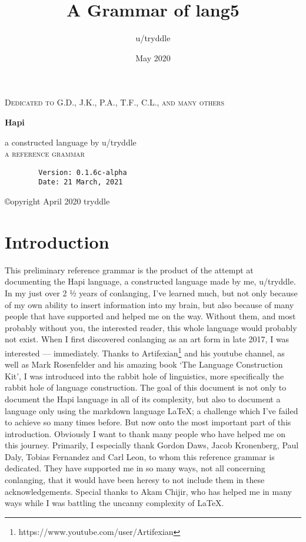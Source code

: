 \documentclass[a4paper, 12pt, oneside]{memoir}
\title{A Grammar of lang5}
\author{u/tryddle}
\date{May 2020}
\makeatletter
\newlength\drop
\newcommand*\titleM{\begingroup%
\setlength\drop{0.08\textheight}
\centering
{\scshape Dedicated to G.D., J.K., P.A., T.F., C.L., and many others\par}
\vspace*{\drop}
   
\vspace*{\drop}
\begin{flushleft}
{\HUGE\bfseries Hapi}\\
\end{flushleft}
\vspace*{\drop}
\vspace*{\drop}
\begin{flushright}
{\LARGE a constructed language by u/tryddle}\\[\baselineskip]
{\scshape a reference grammar}\\[\baselineskip]
{\scshape \@date}\par
\end{flushright}


\endgroup}
\makeatother
\begin{document}
\begin{titlingpage}
\titleM{}
\end{titlingpage}
\pagebreak
{}

\vspace*{\fill}

\begin{center}
    \begin{verbatim}
        Version: 0.1.6c-alpha
        Date: 21 March, 2021
    \end{verbatim}
    ©opyright April 2020 tryddle
\end{center}

\vspace*{\fill}

\restoregeometry

\pagebreak
\setcounter{tocdepth}{4}
\tableofcontents
\newpage 
\listoffigures
\listoftables
\newpage
\printglossaries
\newpage

\chapter{Introduction}
This preliminary reference grammar is the product of the attempt at documenting the Hapi language, a constructed language made by me, u/tryddle. In my just over 2 ½ years of conlanging, I've learned much, but not only because of my own ability to insert information into my brain, but also because of many people that have supported and helped me on the way. Without them, and most probably without you, the interested reader, this whole language would probably not exist. When I first discovered conlanging as an art form in late 2017, I was interested — immediately. Thanks to Artifexian\footnote{https://www.youtube.com/user/Artifexian} and his youtube channel, as well as Mark Rosenfelder and his amazing book `The Language Construction Kit', I was introduced into the rabbit hole of linguistics, more specifically the rabbit hole of language construction. 
The goal of this document is not only to document the Hapi language in all of its complexity, but also to document a language only using the markdown language \LaTeX; a challenge which I've failed to achieve so many times before. 
But now onto the most important part of this introduction. Obviously I want to thank many people who have helped me on this journey. Primarily, I especially thank Gordon Daws, Jacob Kronenberg, Paul Daly, Tobias Fernandez and Carl Leon, to whom this reference grammar is dedicated. They have supported me in so many ways, not all concerning conlanging, that it would have been heresy to not include them in these acknowledgements. Special thanks to Akam Chijir, who has helped me in many ways while I was battling the uncanny complexity of \LaTeX.
\end{document}
